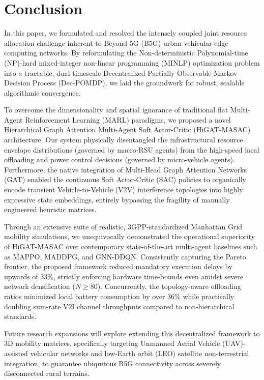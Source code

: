 \section{Conclusion}
\label{sec:conc}

In this paper, we formulated and resolved the intensely coupled joint resource allocation challenge inherent to Beyond 5G (B5G) urban vehicular edge computing networks. By reformulating the Non-deterministic Polynomial-time (NP)-hard mixed-integer non-linear programming (MINLP) optimization problem into a tractable, dual-timescale Decentralized Partially Observable Markov Decision Process (Dec-POMDP), we laid the groundwork for robust, scalable algorithmic convergence.

To overcome the dimensionality and spatial ignorance of traditional flat Multi-Agent Reinforcement Learning (MARL) paradigms, we proposed a novel Hierarchical Graph Attention Multi-Agent Soft Actor-Critic (HiGAT-MASAC) architecture. Our system physically disentangled the infrastructural resource envelope distributions (governed by macro-RSU agents) from the high-speed local offloading and power control decisions (governed by micro-vehicle agents). Furthermore, the native integration of Multi-Head Graph Attention Networks (GAT) enabled the continuous Soft Actor-Critic (SAC) policies to organically encode transient Vehicle-to-Vehicle (V2V) interference topologies into highly expressive state embeddings, entirely bypassing the fragility of manually engineered heuristic matrices.

Through an extensive suite of realistic, 3GPP-standardized Manhattan Grid mobility simulations, we unequivocally demonstrated the operational superiority of HiGAT-MASAC over contemporary state-of-the-art multi-agent baselines such as MAPPO, MADDPG, and GNN-DDQN. Consistently capturing the Pareto frontier, the proposed framework reduced mandatory execution delays by upwards of $33\%$, strictly enforcing hardware time-bounds even amidst severe network densification ($N \ge 80$). Concurrently, the topology-aware offloading ratios minimized local battery consumption by over $36\%$ while practically doubling sum-rate V2I channel throughputs compared to non-hierarchical standards.

Future research expansions will explore extending this decentralized framework to 3D mobility matrices, specifically targeting Unmanned Aerial Vehicle (UAV)-assisted vehicular networks and low-Earth orbit (LEO) satellite non-terrestrial integration, to guarantee ubiquitous B5G connectivity across severely disconnected rural terrains.
